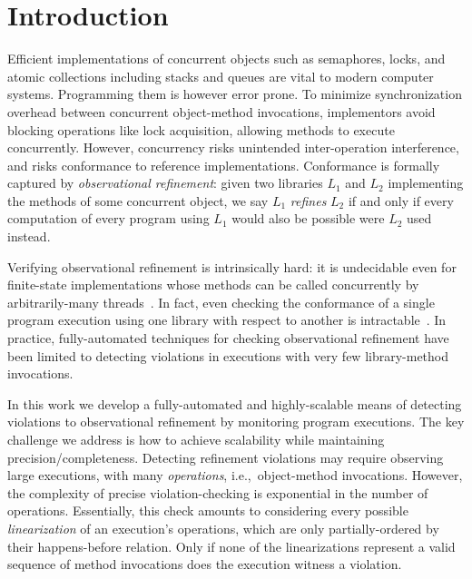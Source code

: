 
\section{Introduction}
\label{sec:intro}

Efficient implementations of concurrent objects such as semaphores, locks, and
atomic collections including stacks and queues are vital to modern computer
systems. Programming them is however error prone. To minimize synchronization
overhead between concurrent object-method invocations, implementors avoid
blocking operations like lock acquisition, allowing methods to execute
concurrently. However, concurrency risks unintended inter-operation
interference, and risks conformance to reference implementations. Conformance
is formally captured by \emph{observational refinement}: given two libraries
$L_1$ and $L_2$ implementing the methods of some concurrent object, we say
$L_1$ \emph{refines} $L_2$ if and only if every computation of every program
using $L_1$ would also be possible were $L_2$ used instead.

Verifying observational refinement is intrinsically hard: it is undecidable
even for finite-state implementations whose methods can be called concurrently
by arbitrarily-many threads~\cite{conf/esop/BouajjaniEEH13}. In fact, even
checking the conformance of a single program execution using one library with
respect to another is intractable~\cite{journals/siamcomp/GibbonsK97}. In
practice, fully-automated techniques for checking observational refinement have
been limited to detecting violations in executions with very few library-method
invocations.

In this work we develop a fully-automated and highly-scalable means of
detecting violations to observational refinement by monitoring program
executions. The key challenge we address is how to achieve scalability while
maintaining precision/completeness. Detecting refinement violations may require
observing large executions, with many \emph{operations}, i.e.,~object-method
invocations. However, the complexity of precise violation-checking is
exponential in the number of operations. Essentially, this check amounts to
considering every possible \emph{linearization} of an execution's operations,
which are only partially-ordered by their happens-before relation. Only if none
of the linearizations represent a valid sequence of method invocations does the
execution witness a violation.

